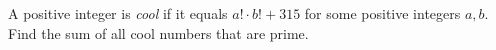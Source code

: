 A positive integer is \emph{cool} if it equals $a!\cdot b!+315$ for some positive integers $a,b$. Find the sum of all cool numbers that are prime.
